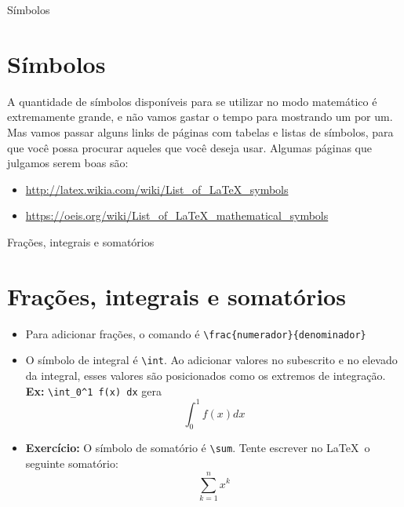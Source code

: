 \documentclass[12pt]{beamer}
\begin{document}
\begin{frame}{Símbolos}
  \section{Símbolos}

  A quantidade de símbolos disponíveis para se utilizar no modo matemático é extremamente grande, e não vamos gastar o tempo para mostrando um por um. Mas vamos passar alguns links de páginas com tabelas e listas de símbolos, para que você possa procurar aqueles que você deseja usar. Algumas páginas que julgamos serem boas são:

  \begin{itemize}
    \item \url{http://latex.wikia.com/wiki/List_of_LaTeX_symbols}
    \item \url{https://oeis.org/wiki/List_of_LaTeX_mathematical_symbols}
  \end{itemize}
\end{frame}

\begin{frame}[fragile]{Frações, integrais e somatórios}
  \section{Frações, integrais e somatórios}
  \begin{itemize}
    \item Para adicionar frações, o comando é \verb+\frac{numerador}{denominador}+
    \item O símbolo de integral é \verb+\int+. Ao adicionar valores no subescrito e no elevado da integral, esses valores são posicionados como os extremos de integração. \textbf{Ex:} \verb+\int_0^1 f(x) dx+ gera
    \[
    \int_{0}^1 f(x) dx
    \]
    \item \textbf{Exercício:} O símbolo de somatório é \verb+\sum+. Tente escrever no \LaTeX\ o seguinte somatório:
    \[
      \sum_{k=1}^n x^k
    \]
  \end{itemize}
\end{frame}
\end{document}
